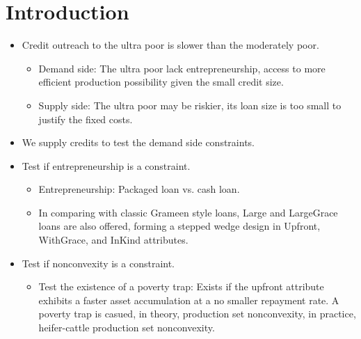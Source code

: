 \renewcommand{\thefootnote}{*\arabic{footnote}}
\setcounter{footnote}{0}

\section{Introduction}

\begin{mdframed}[style={SecItemize}, frametitle={Introduction}]
\begin{itemize}
\vspace{1.0ex}\setlength{\itemsep}{1.0ex}\setlength{\baselineskip}{12pt}
\item	Credit outreach to the ultra poor is slower than the moderately poor.
	\begin{itemize}
	\vspace{1.0ex}\setlength{\itemsep}{1.0ex}\setlength{\baselineskip}{12pt}
	\item	Demand side: The ultra poor lack entrepreneurship, access to more efficient production possibility given the small credit size. 
	\item	Supply side: The ultra poor may be riskier, its loan size is too small to justify the fixed costs.
	\end{itemize}
\item	We supply credits to test the demand side constraints.
\item	Test if entrepreneurship is a constraint.
	\begin{itemize}
	\vspace{1.0ex}\setlength{\itemsep}{1.0ex}\setlength{\baselineskip}{12pt}
	\item	Entrepreneurship: Packaged loan vs. cash loan.
	\item	In comparing with classic Grameen style loans, Large and LargeGrace loans are also offered, forming a stepped wedge design in \textsf{Upfront}, \textsf{WithGrace}, and \textsf{InKind} attributes.
	\end{itemize}
\item	Test if nonconvexity is a constraint.
	\begin{itemize}
	\vspace{1.0ex}\setlength{\itemsep}{1.0ex}\setlength{\baselineskip}{12pt}
	\item	Test the existence of a poverty trap: Exists if the upfront attribute exhibits a faster asset accumulation at a no smaller repayment rate. A poverty trap is casued, in theory, production set nonconvexity, in practice, heifer-cattle production set nonconvexity.
	\end{itemize}
\end{itemize}
\end{mdframed}

